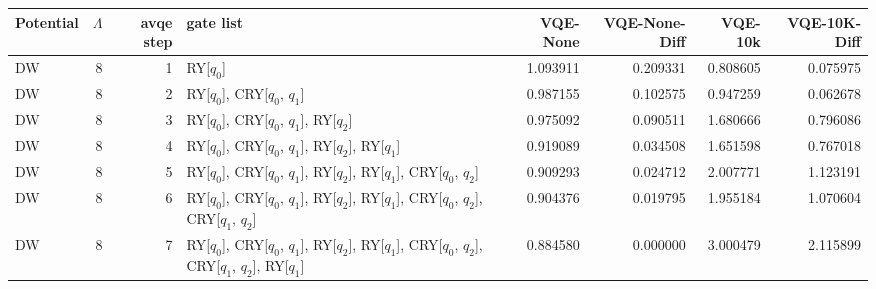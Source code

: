\begin{tabular}{lrrlrrrr}
\toprule
Potential & $\Lambda$ & avqe step & gate list & VQE-None & VQE-None-Diff & VQE-10k & VQE-10K-Diff \\
\midrule
DW & 8 & 1 & RY[$q_0$] & 1.093911 & 0.209331 & 0.808605 & 0.075975 \\
DW & 8 & 2 & RY[$q_0$], CRY[$q_0$, $q_1$] & 0.987155 & 0.102575 & 0.947259 & 0.062678 \\
DW & 8 & 3 & RY[$q_0$], CRY[$q_0$, $q_1$], RY[$q_2$] & 0.975092 & 0.090511 & 1.680666 & 0.796086 \\
DW & 8 & 4 & RY[$q_0$], CRY[$q_0$, $q_1$], RY[$q_2$], RY[$q_1$] & 0.919089 & 0.034508 & 1.651598 & 0.767018 \\
DW & 8 & 5 & RY[$q_0$], CRY[$q_0$, $q_1$], RY[$q_2$], RY[$q_1$], CRY[$q_0$, $q_2$] & 0.909293 & 0.024712 & 2.007771 & 1.123191 \\
DW & 8 & 6 & RY[$q_0$], CRY[$q_0$, $q_1$], RY[$q_2$], RY[$q_1$], CRY[$q_0$, $q_2$], CRY[$q_1$, $q_2$] & 0.904376 & 0.019795 & 1.955184 & 1.070604 \\
DW & 8 & 7 & RY[$q_0$], CRY[$q_0$, $q_1$], RY[$q_2$], RY[$q_1$], CRY[$q_0$, $q_2$], CRY[$q_1$, $q_2$], RY[$q_1$] & 0.884580 & 0.000000 & 3.000479 & 2.115899 \\
\bottomrule
\end{tabular}
